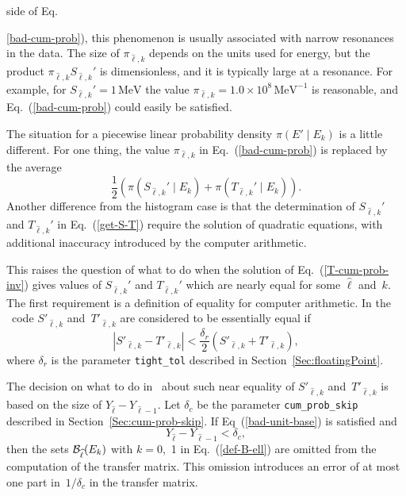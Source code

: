 side of Eq.~{\ref{bad-cum-prob}), this phenomenon is usually associated
with narrow resonances in the data.  The size of $ \pi_{\widehat \ell,k}$ depends
on the units used for energy, but the product $ \pi_{\widehat \ell,k} S_{\widehat \ell,k}' $
is dimensionless, and it is typically large at a resonance.  For example, 
for $S_{\widehat \ell,k}'  = 1\,\text{MeV}$ the value $ \pi_{\widehat \ell,k} 
= 1.0 \times 10^8\,\text{MeV}^{-1}$ is reasonable, and Eq.~(\ref{bad-cum-prob})
could easily be satisfied.

The situation for a piecewise linear probability density $\pi(E' \mid E_k )$ is
a little different.  For one thing, the value $ \pi_{\widehat \ell,k}$ in
Eq.~(\ref{bad-cum-prob}) is replaced by the average
$$
  \frac{1}{2} \left(
    \pi( S_{\widehat \ell,k}' \mid E_k ) +  \pi( T_{\widehat \ell,k}' \mid E_k ) 
  \right).
$$
Another difference from the histogram case is that the determination of
$S_{\widehat \ell,k}' $ and $T_{\widehat \ell,k}' $ in Eq.~(\ref{get-S-T}) 
require the solution of quadratic equations, with additional inaccuracy
introduced by the computer arithmetic.

This raises the question of what to do when the solution of
Eq.~(\ref{T-cum-prob-inv}) gives values of $S_{ \widehat \ell,k}'$ and 
$T_{\widehat \ell,k}'$
which are nearly equal for some $\widehat \ell$ and~$k$.
The first requirement is a definition of equality for computer arithmetic.
In the \gettransfer\ code $S'_{ \widehat \ell,k}$ and~$T'_{ \widehat \ell,k}$
are considered to be essentially equal if
\begin{equation}
  \left| 
    S'_{ \widehat \ell,k} - T'_{ \widehat \ell,k}
  \right| <
  \frac{ \delta_r} {2} \left(
    S'_{ \widehat \ell,k} + T'_{ \widehat \ell,k}
  \right),
 \label{bad-unit-base}
\end{equation}
where $\delta_r$ is the parameter \texttt{tight\_tol}
described in Section~\ref{Sec:floatingPoint}.  

 The decision on what to do in \gettransfer\ about such near equality of
$S'_{ \widehat \ell,k}$ and~$T'_{ \widehat \ell,k}$  is based on the size of
$Y_{\widehat \ell} - Y_{\widehat \ell-1}$.  Let $\delta_c$
be the parameter \texttt{cum\_prob\_skip} described in
Section~\ref{Sec:cum-prob-skip}. 
If Eq~(\ref{bad-unit-base})
is satisfied and
\begin{equation}
  Y_{\widehat \ell} - Y_{\widehat \ell-1} < \delta_c,
 \label{drop-B-ell}
\end{equation}
then the sets ${\cal B}_{\widehat \ell}(E_k)$ with $k = 0$,~1
in Eq.~(\ref{def-B-ell}) are omitted from the computation of the
transfer matrix.  This omission introduces an error of at most one part
in~$1/\delta_c$ in the transfer matrix.

}
